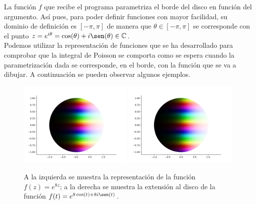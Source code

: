La función $f$ que recibe el programa parametriza el borde del disco en función del argumento. Así pues, para poder definir funciones con mayor facilidad, su dominio de definición es $[-\pi, \pi]$ de manera que $\theta \in [-\pi, \pi]$ se corresponde con el punto $z = e^{i \theta} = \cos(\theta) + i \sen(\theta) \in \complex$. \\

Podemos utilizar la representación de funciones que se ha desarrollado para comprobar que la integral de Poisson se comporta como se espera cuando la parametrización dada se corresponde, en el borde, con la función que se va a dibujar. A continuación se pueden observar algunos ejemplos. \\

\begin{figure}[h]
    \centering
    \includegraphics[width=0.49\textwidth]{../Aplicacion/e^(8z).png}
    \hfill
    \includegraphics[width=0.49\textwidth]{../Aplicacion/e^(8cos(t)+8isen(t)).png}
    \caption{A la izquierda se muestra la representación de la función $f(z) = e^{8z}$; a la derecha se muestra la extensión al disco de la función $f(t) = e^{8 \cos(t)+8i \sen(t)}$.}
    \label{fig:comparacion1}
\end{figure}

